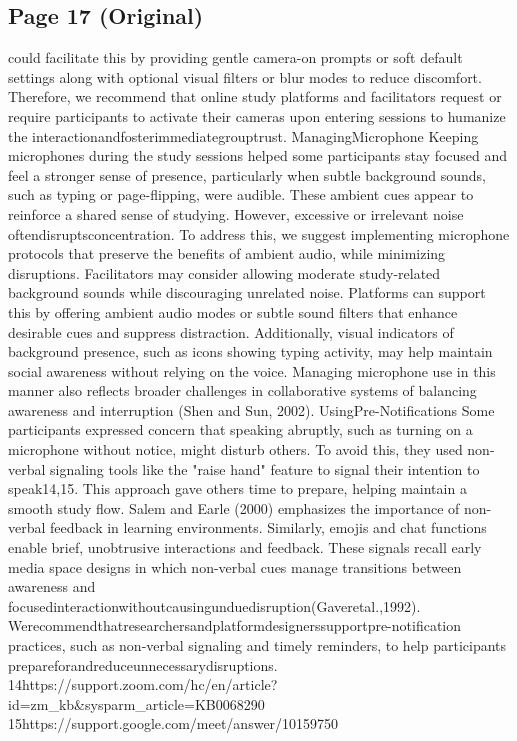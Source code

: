 \documentclass[12pt]{ctexart}
\begin{document}
\subsection*{Page 17 (Original)}

could facilitate this by providing gentle camera-on prompts or soft default settings
along with optional visual filters or blur modes to reduce discomfort. Therefore,
we recommend that online study platforms and facilitators request or require
participants to activate their cameras upon entering sessions to humanize the
interactionandfosterimmediategrouptrust.
ManagingMicrophone
Keeping microphones during the study sessions helped some participants stay
focused and feel a stronger sense of presence, particularly when subtle background
sounds, such as typing or page-flipping, were audible. These ambient cues appear
to reinforce a shared sense of studying. However, excessive or irrelevant noise
oftendisruptsconcentration.
To address this, we suggest implementing microphone protocols that preserve
the benefits of ambient audio, while minimizing disruptions. Facilitators may
consider allowing moderate study-related background sounds while discouraging
unrelated noise. Platforms can support this by offering ambient audio modes or
subtle sound filters that enhance desirable cues and suppress distraction.
Additionally, visual indicators of background presence, such as icons showing
typing activity, may help maintain social awareness without relying on the voice.
Managing microphone use in this manner also reflects broader challenges in
collaborative systems of balancing awareness and interruption (Shen and Sun,
2002).
UsingPre-Notifications
Some participants expressed concern that speaking abruptly, such as turning on a
microphone without notice, might disturb others. To avoid this, they used
non-verbal signaling tools like the "raise hand" feature to signal their intention to
speak14,15.
This approach gave others time to prepare, helping maintain a smooth study
flow. Salem and Earle (2000) emphasizes the importance of non-verbal feedback
in learning environments. Similarly, emojis and chat functions enable brief,
unobtrusive interactions and feedback. These signals recall early media space
designs in which non-verbal cues manage transitions between awareness and
focusedinteractionwithoutcausingunduedisruption(Gaveretal.,1992).
Werecommendthatresearchersandplatformdesignerssupportpre-notification
practices, such as non-verbal signaling and timely reminders, to help participants
prepareforandreduceunnecessarydisruptions.
14https://support.zoom.com/hc/en/article?id=zm\_kb\&sysparm\_article=KB0068290
15https://support.google.com/meet/answer/10159750
\end{document}
